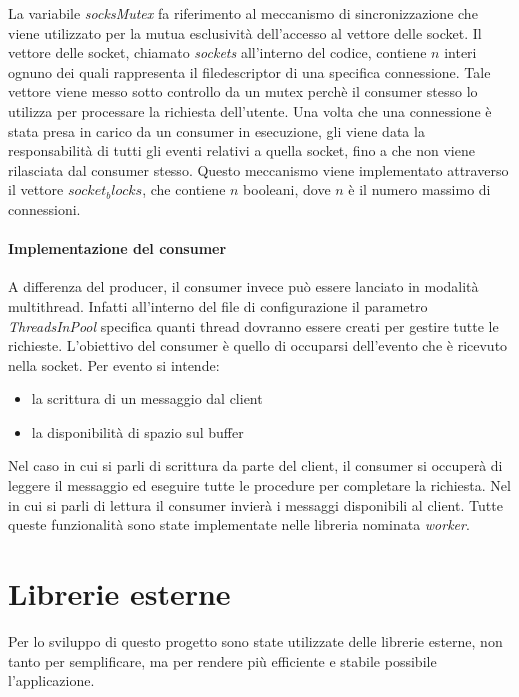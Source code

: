 \documentclass[]{article}
\begin{document}
La variabile \textit{socksMutex} fa riferimento al meccanismo di sincronizzazione
che viene utilizzato per la mutua esclusivit\`a dell'accesso al vettore delle socket.
Il vettore delle socket, chiamato \textit{sockets} all'interno del codice, contiene
$n$ interi ognuno dei quali rappresenta il filedescriptor di una specifica connessione.
Tale vettore viene messo sotto controllo da un mutex perch\`e il consumer stesso lo utilizza
per processare la richiesta dell'utente.
Una volta che una connessione \`e stata presa in carico da un consumer in esecuzione,
gli viene data la responsabilit\`a di tutti gli eventi relativi a quella socket, fino a
che non viene rilasciata dal consumer stesso.
Questo meccanismo viene implementato attraverso il vettore $socket_blocks$, che contiene
$n$ booleani, dove $n$ \`e il numero massimo di connessioni.

\paragraph{Implementazione del consumer}
A differenza del producer, il consumer invece pu\`o essere lanciato in modalit\`a multithread.
Infatti all'interno del file di configurazione il parametro \textit{ThreadsInPool} specifica
quanti thread dovranno essere creati per gestire tutte le richieste.
L'obiettivo del consumer \`e quello di occuparsi dell'evento che \`e ricevuto nella socket.
Per evento si intende:
\begin{itemize}
	\item la scrittura di un messaggio dal client
	\item la disponibilit\`a di spazio sul buffer
\end{itemize}
Nel caso in cui si parli di scrittura da parte del client, il consumer si occuper\`a di leggere
il messaggio ed eseguire tutte le procedure per completare la richiesta.
Nel in cui si parli di lettura il consumer invierà i messaggi disponibili al client.
Tutte queste funzionalit\`a sono state implementate nelle libreria nominata \textit{worker}.

\section{Librerie esterne}
Per lo sviluppo di questo progetto sono state utilizzate delle librerie esterne, non tanto per semplificare, ma per rendere
pi\`u efficiente e stabile possibile l'applicazione.
\end{document}
